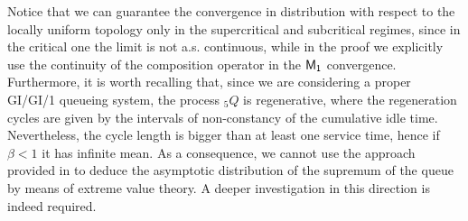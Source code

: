 \documentclass[]{amsart}
\numberwithin{equation}{section}
\theoremstyle{remark}
\theoremstyle{definition}
\begin{document}
{Notice that we can guarantee the convergence in distribution with respect to the locally uniform topology only in the supercritical and subcritical regimes, since in the critical one the limit is not a.s. continuous, while in the proof we explicitly use the continuity of the composition operator in the ${\sf M_1}$ convergence. Furthermore, it is worth recalling that, since we are considering a proper GI/GI/1 queueing system, the process ${}_5Q$ is regenerative, where the regeneration cycles are given by the intervals of non-constancy of the cumulative idle time. Nevertheless, the cycle length is bigger than at least one service time, hence if $\beta<1$ it has infinite mean. As a consequence, we cannot use the approach provided in \cite{asmussen1998extreme} to deduce the asymptotic distribution of the supremum of the queue by means of extreme value theory. A deeper investigation in this direction is indeed required.} 
\end{document}
